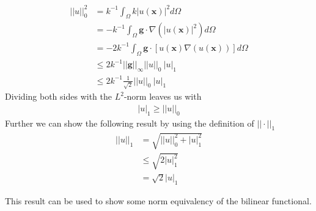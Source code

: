 \begin{align}
	||u||_0^2 &= k^{-1}\int_{\Omega}k|u(\mathbf{x})|^2d\Omega \\
	&= -k^{-1}\int_{\Omega}\mathbf{g}\cdot \nabla(|u(\mathbf{x})|^2)d\Omega \\
	&= -2k^{-1}\int_{\Omega}\mathbf{g}\cdot [u(\mathbf{x})\nabla(u(\mathbf{x}))]d\Omega \\
	&\leq 2k^{-1}||\mathbf{g}||_{\infty}||u||_0 \: |u|_1\\
	&\leq 2k^{-1}\frac{1}{\sqrt{2}}||u||_0 \: |u|_1
	\label{eq:PoincareProof}
\end{align}
Dividing both sides with the $L^2$-norm leaves us with
\begin{align}
	|u|_1 \geq ||u||_0
	\label{eq:PoincareStatement}
\end{align}
Further we can show the following result by using the definition of $||\cdot||_1$
\begin{align}
	||u||_1 &= \sqrt{||u||_0^2+|u|_1^2}\\
	&	\leq \sqrt{2|u|_1^2}\\
	&= \sqrt{2}|u|_1
	\label{eq:NormInequalitySobolev}
\end{align}

This result can be used to show some norm equivalency of the bilinear functional. 
